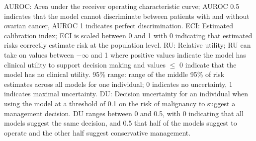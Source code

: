 \begin{table}
\centering
\footnotesize
\caption[Population level performance and individual risk uncertainty]{Population level performance and individual risk uncertainty for the 100 test set patients.}
\label{tab:5:2}
\begin{minipage}{\textwidth}
\vspace{0.5em}
\scriptsize
AUROC: Area under the receiver operating characteristic curve; AUROC 0.5 indicates that the model cannot discriminate between patients with and without ovarian cancer, AUROC 1 indicates perfect discrimination. ECI: Estimated calibration index; ECI is scaled between 0 and 1 with 0 indicating that estimated risks correctly estimate risk at the population level. RU: Relative utility; RU can take on values between $-\infty$ and 1 where positive values indicate the model has clinical utility to support decision making and values $\leq$ 0 indicate that the model has no clinical utility. 95\% range: range of the middle 95\% of risk estimates across all models for one individual; 0 indicates no uncertainty, 1 indicates maximal uncertainty. DU: Decision uncertainty for an individual when using the model at a threshold of 0.1 on the risk of malignancy to suggest a management decision. DU ranges between 0 and 0.5, with 0 indicating that all models suggest the same decision, and 0.5 that half of the models suggest to operate and the other half suggest conservative management.


\end{minipage}
\end{table}
